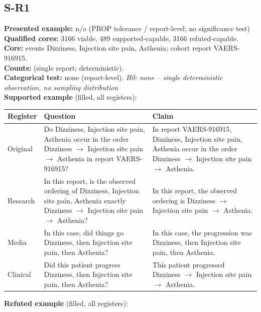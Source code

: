 \documentclass[11pt]{article}
\begin{document}
\subsection*{S-R1}
\textbf{Presented example:} n/a (PROP tolerance / report-level; no significance test) \\
\textbf{Qualified cores:} 3166 viable, 489 supported-capable, 3166 refuted-capable. \\
\textbf{Core:} events Dizziness, Injection site pain, Asthenia; cohort report VAERS-916915. \\
\textbf{Counts:} (single report; deterministic). \\
\textbf{Categorical test:} none (report-level). \emph{H0: none -- single deterministic observation, no sampling distribution} \\
\textbf{Supported example} (filled, all registers): \\
\begin{tabularx}{\linewidth}{@{}l L L@{}}
\toprule
\textbf{Register} & \textbf{Question} & \textbf{Claim} \\
\midrule
Original & Do Dizziness, Injection site pain, Asthenia occur in the order Dizziness $\rightarrow$  Injection site pain $\rightarrow$  Asthenia in report VAERS-916915? & In report VAERS-916915, Dizziness, Injection site pain, Asthenia occur in the order Dizziness $\rightarrow$  Injection site pain $\rightarrow$  Asthenia. \\
Research & In this report, is the observed ordering of Dizziness, Injection site pain, Asthenia exactly Dizziness $\rightarrow$  Injection site pain $\rightarrow$  Asthenia? & In this report, the observed ordering is Dizziness $\rightarrow$  Injection site pain $\rightarrow$  Asthenia. \\
Media & In this case, did things go Dizziness, then Injection site pain, then Asthenia? & In this case, the progression was Dizziness, then Injection site pain, then Asthenia. \\
Clinical & Did this patient progress Dizziness, then Injection site pain, then Asthenia? & This patient progressed Dizziness $\rightarrow$  Injection site pain $\rightarrow$  Asthenia. \\
\bottomrule
\end{tabularx}
\vspace{3pt}
\textbf{Refuted example} (filled, all registers): \\
\end{document}
